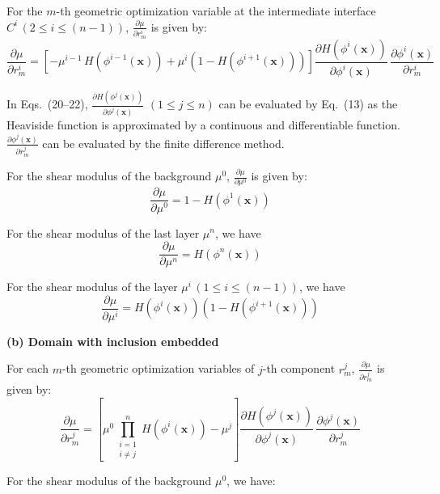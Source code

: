 \documentclass[11pt]{article}
\begin{document}
For the $m$-th geometric optimization variable at the intermediate
interface $C^{i}\,(2 \leq i \leq (n-1))$,
$\frac{\partial\mu}{\partial r^{i}_{m}}$ is given by:
\begin{equation}
\frac{\partial\mu}{\partial r^{i}_{m}}
= \left[-\mu^{i-1}\, H\!\left(\phi^{i-1}(\mathbf{x})\right)
        + \mu^{i}\!\left(1 - H\!\left(\phi^{i+1}(\mathbf{x})\right)\right)\right]
  \frac{\partial H\!\left(\phi^{i}(\mathbf{x})\right)}{\partial\phi^{i}(\mathbf{x})}\,
  \frac{\partial\phi^{i}(\mathbf{x})}{\partial r^{i}_{m}}
\end{equation}

In Eqs.~(20--22),
$\frac{\partial H(\phi^{j}(\mathbf{x}))}{\partial\phi^{j}(\mathbf{x})}$
$(1 \leq j \leq n)$ can be evaluated by Eq.~(13) as the Heaviside
function is approximated by a continuous and differentiable function.
$\frac{\partial\phi^{j}(\mathbf{x})}{\partial r^{j}_{m}}$ can be
evaluated by the finite difference method.

For the shear modulus of the background $\mu^{0}$,
$\frac{\partial\mu}{\partial\mu^{0}}$ is given by:
\begin{equation}
\frac{\partial\mu}{\partial\mu^{0}} = 1 - H\!\left(\phi^{1}(\mathbf{x})\right)
\end{equation}

For the shear modulus of the last layer $\mu^{n}$, we have
\begin{equation}
\frac{\partial\mu}{\partial\mu^{n}} = H(\phi^{n}(\mathbf{x}))
\end{equation}

For the shear modulus of the layer $\mu^{i}\,(1 \leq i \leq (n-1))$,
we have
\begin{equation}
\frac{\partial\mu}{\partial\mu^{i}}
= H\!\left(\phi^{i}(\mathbf{x})\right)
  \left(1 - H\!\left(\phi^{i+1}(\mathbf{x})\right)\right)
\end{equation}

\medskip
\noindent
\textbf{(b) Domain with inclusion embedded}

\medskip
\noindent
For each $m$-th geometric optimization variables of $j$-th component
$r^{j}_{m}$,
$\frac{\partial\mu}{\partial r^{j}_{m}}$ is given by:
\begin{equation}
\frac{\partial\mu}{\partial r^{j}_{m}}
= \left[\mu^{0}\!\prod_{\substack{i=1 \\ i \neq j}}^{n}
         H\!\left(\phi^{i}(\mathbf{x})\right)
  - \mu^{j}\right]
  \frac{\partial H\!\left(\phi^{j}(\mathbf{x})\right)}{\partial\phi^{j}(\mathbf{x})}\,
  \frac{\partial\phi^{j}(\mathbf{x})}{\partial r^{j}_{m}}
\end{equation}

For the shear modulus of the background $\mu^{0}$, we have:

\end{document}
